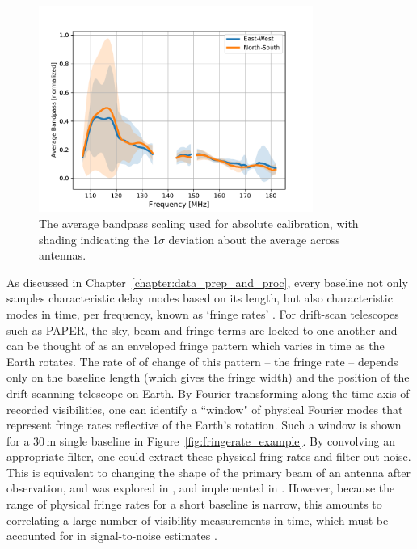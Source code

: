 \begin{figure}
\centering
\includegraphics[width=0.8\textwidth]{chapters/psa128_pol/figures/avg_bandpasses.pdf}
\caption[The average bandpass scaling used for absolute calibration.]{The average bandpass scaling used for absolute calibration, with shading indicating the 1$\sigma$ deviation about the average across antennas.}
\label{fig:psa128_bandpases}
\end{figure}

As discussed in Chapter~\ref{chapter:data_prep_and_proc}, every baseline not only samples characteristic delay modes based on its length, but also characteristic modes in time, per frequency, known as `fringe rates' \citep[if frequency dependence is ignored, they are referred to as ``delay rates"; e.g.][]{ParsonsBacker.09}. For drift-scan telescopes such as PAPER, the sky, beam and fringe terms are locked to one another and can be thought of as an enveloped fringe pattern which varies in time as the Earth rotates. The rate of of change of this pattern -- the fringe rate -- depends only on the baseline length (which gives the fringe width) and the position of the drift-scanning telescope on Earth. By Fourier-transforming along the time axis of recorded visibilities, one can identify a ``window" of physical Fourier modes that represent fringe rates reflective of the Earth's rotation. Such a window is shown for a 30\,m single baseline in Figure~\ref{fig:fringerate_example}. By convolving an appropriate filter, one could extract these physical fring rates and filter-out noise. This is equivalent to changing the shape of the primary beam of an antenna after observation, and was explored in \cite{Parsons.15}, and implemented in \cite{Ali.15}. However, because the range of physical fringe rates for a short baseline is narrow, this amounts to correlating a large number of visibility measurements in time, which must be accounted for in signal-to-noise estimates \citep[][{\color{red} Cheng et al. (2018)}]{Ali.15}.

